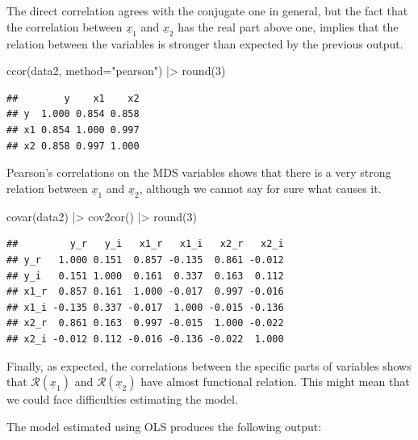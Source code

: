 \documentclass[
]{book}
\newenvironment{Shaded}{\begin{snugshade}}{\end{snugshade}}
\newcommand{\AttributeTok}[1]{\textcolor[rgb]{0.77,0.63,0.00}{#1}}
\newcommand{\DecValTok}[1]{\textcolor[rgb]{0.00,0.00,0.81}{#1}}
\newcommand{\FunctionTok}[1]{\textcolor[rgb]{0.00,0.00,0.00}{#1}}
\newcommand{\NormalTok}[1]{#1}
\newcommand{\SpecialCharTok}[1]{\textcolor[rgb]{0.00,0.00,0.00}{#1}}
\newcommand{\StringTok}[1]{\textcolor[rgb]{0.31,0.60,0.02}{#1}}
\begin{document}
The direct correlation agrees with the conjugate one in general, but the fact that the correlation between \(\underline{x}_{1}\) and \(\underline{x}_{2}\) has the real part above one, implies that the relation between the variables is stronger than expected by the previous output.

\begin{Shaded}
\begin{Highlighting}[]
\FunctionTok{ccor}\NormalTok{(data2, }\AttributeTok{method=}\StringTok{"pearson"}\NormalTok{) }\SpecialCharTok{|\textgreater{}} \FunctionTok{round}\NormalTok{(}\DecValTok{3}\NormalTok{)}
\end{Highlighting}
\end{Shaded}

\begin{verbatim}
##        y    x1    x2
## y  1.000 0.854 0.858
## x1 0.854 1.000 0.997
## x2 0.858 0.997 1.000
\end{verbatim}

Pearson's correlations on the MDS variables shows that there is a very strong relation between \(\underline{x}_{1}\) and \(\underline{x}_{2}\), although we cannot say for sure what causes it.

\begin{Shaded}
\begin{Highlighting}[]
\FunctionTok{covar}\NormalTok{(data2) }\SpecialCharTok{|\textgreater{}} \FunctionTok{cov2cor}\NormalTok{() }\SpecialCharTok{|\textgreater{}} \FunctionTok{round}\NormalTok{(}\DecValTok{3}\NormalTok{)}
\end{Highlighting}
\end{Shaded}

\begin{verbatim}
##         y_r   y_i   x1_r   x1_i   x2_r   x2_i
## y_r   1.000 0.151  0.857 -0.135  0.861 -0.012
## y_i   0.151 1.000  0.161  0.337  0.163  0.112
## x1_r  0.857 0.161  1.000 -0.017  0.997 -0.016
## x1_i -0.135 0.337 -0.017  1.000 -0.015 -0.136
## x2_r  0.861 0.163  0.997 -0.015  1.000 -0.022
## x2_i -0.012 0.112 -0.016 -0.136 -0.022  1.000
\end{verbatim}

Finally, as expected, the correlations between the specific parts of variables shows that \(\mathcal{R}\left(\underline{x}_1\right)\) and \(\mathcal{R}\left(\underline{x}_2\right)\) have almost functional relation. This might mean that we could face difficulties estimating the model.

The model estimated using OLS produces the following output:
\end{document}
